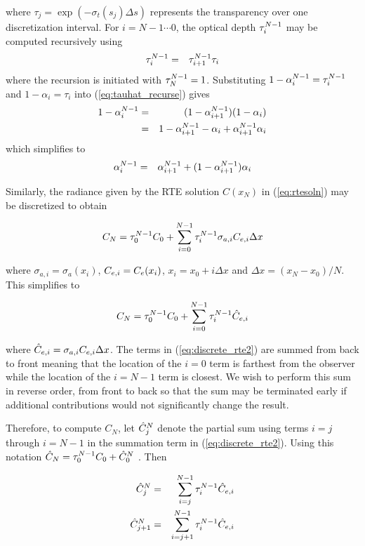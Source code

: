where $\tau_j=\exp\left(-\sigma_t(s_j)\Delta s\right)$ represents the transparency over one discretization interval.
For $i=N-1\cdots 0$, the optical depth $\tau_{i}^{N-1}$ may be computed recursively using
\begin{eqnarray}
\label{eq:tauhat_recurse}
\tau_{i}^{N-1}&=&\tau_{i+1}^{N-1}\tau_i
\end{eqnarray}
where the recursion is initiated with $\tau_{N}^{N-1}=1$.
Substituting $1-\alpha_{i}^{N-1}=\tau_{i}^{N-1}$ and $1-\alpha_i=\tau_i$ into (\ref{eq:tauhat_recurse}) gives
\begin{eqnarray*}
1-\alpha_{i}^{N-1}&=&(1-\alpha_{i+1}^{N-1})(1-\alpha_i)\\
&=&1-\alpha_{i+1}^{N-1} - \alpha_i + \alpha_{i+1}^{N-1}\alpha_i
\end{eqnarray*}
which simplifies to
\begin{eqnarray}
\label{eq:alpha2}
\alpha_{i}^{N-1}&=&\alpha_{i+1}^{N-1} + (1-\alpha_{i+1}^{N-1})\alpha_i
\end{eqnarray}

Similarly, the radiance given by the RTE solution $C(x_N)$ in (\ref{eq:rtesoln}) may be discretized to obtain

\begin{eqnarray*}
C_{N} = \tau_{0}^{N-1}C_0 +
\sum_{i=0}^{N-1}\tau_{i}^{N-1}\sigma_{a,i}C_{e,i}\Delta x
\end{eqnarray*}

where $\sigma_{a,i}=\sigma_a(x_i)$, $C_{e,i}=C_e(x_i)$, $x_i=x_0+i\Delta x$ and $\Delta x=(x_N-x_0)/N$.
This simplifies to

\begin{equation}
\label{eq:discrete_rte2}
C_N = \tau_{0}^{N-1}C_0 + \sum_{i=0}^{N-1}\tau_{i}^{N-1}\hat{C}_{e,i}
\end{equation}

where $\hat{C}_{e,i}=\sigma_{a,i}C_{e,i}\Delta x$.  The terms in (\ref{eq:discrete_rte2}) are summed from back to front meaning that the location of the $i=0$ term is farthest from the observer while the location of the $i=N-1$ term is closest.  We wish to perform this sum in reverse order, from front to back so that the sum may be terminated early if additional contributions would not significantly change the result.

Therefore, to compute $C_N$, let $\hat{C}_{j}^N$ denote the partial sum using terms $i=j$ through $i=N-1$ in the summation term in (\ref{eq:discrete_rte2}).  Using this notation $\hat{C}_N=\tau_{0}^{N-1}C_0+\hat{C}_{0}^N$ . Then

\begin{eqnarray}
\label{eq:recurse1}
\hat{C}_{j}^N &= &\sum_{i=j}^{N-1}\tau_{i}^{N-1}\hat{C}_{e,i}\\
\label{eq:recurse2}
\hat{C}_{j+1}^N     &= &\sum_{i=j+1}^{N-1}  \tau_{i}^{N-1}\hat{C}_{e,i}
\end{eqnarray}

